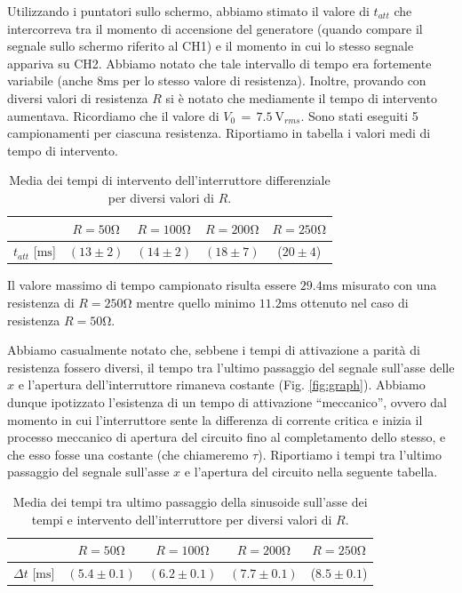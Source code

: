 Utilizzando i puntatori sullo schermo, abbiamo stimato il valore di $t_{att}$ che intercorreva tra il momento di accensione del generatore (quando compare il segnale sullo schermo riferito al CH1) e il momento in cui lo stesso segnale appariva su CH2. Abbiamo notato che tale intervallo di tempo era fortemente variabile (anche $8\si{\milli\second}$ per lo stesso valore di resistenza). Inoltre, provando con diversi valori di resistenza $R$ si è notato che mediamente il tempo di intervento aumentava. Ricordiamo che il valore di $V_0 \, = \, \SI{7.5}{\volt}_{rms}$. Sono stati eseguiti 5 campionamenti per ciascuna resistenza. Riportiamo in tabella i valori medi di tempo di intervento.

\begin{table}[h]
\centering
\caption{Media dei tempi di intervento dell'interruttore differenziale per diversi valori di $R$.}
{\renewcommand{\arraystretch}{1.6}%
\begin{tabular}{c|c|c|c|c}
 & $R=50 \si{\ohm}$ & $R=100 \si{\ohm}$ & $R=200 \si{\ohm}$ & $R=250 \si{\ohm}$ \\      \hline
$t_{att}$ [$\si{\milli\second}$] & $(13 \pm 2)$ & $(14 \pm 2)$ & $(18 \pm 7)$ & ($20 \pm 4$) \\\end{tabular}}
\end{table}


Il valore massimo di tempo campionato risulta essere $29.4\si{\milli\second}$ misurato con una resistenza di $R=250 \si{\ohm}$ mentre quello minimo $11.2\si{\milli\second}$ ottenuto nel caso di resistenza $R=50 \si{\ohm}$.

Abbiamo casualmente notato che, sebbene i tempi di attivazione a parità di resistenza fossero diversi, il tempo tra l'ultimo passaggio del segnale sull'asse delle $x$ e l'apertura dell'interruttore rimaneva costante (Fig. \ref{fig:graph}). Abbiamo dunque ipotizzato l'esistenza di un tempo di attivazione ``meccanico'', ovvero dal momento in cui l'interruttore sente la differenza di corrente critica e inizia il processo meccanico di apertura del circuito fino al completamento dello stesso, e che esso fosse una costante (che chiameremo $\tau$).  Riportiamo i tempi tra l'ultimo passaggio del segnale sull'asse $x$ e l'apertura del circuito nella seguente tabella. 

\begin{table}[h]
\centering
\parbox{14 cm}{\caption{Media dei tempi tra ultimo passaggio della sinusoide sull'asse dei tempi e intervento dell'interruttore per diversi valori di $R$.}}
{\renewcommand{\arraystretch}{1.6}%
\begin{tabular}{c|c|c|c|c}
 & $R=50 \si{\ohm}$ & $R=100 \si{\ohm}$ & $R=200 \si{\ohm}$ & $R=250 \si{\ohm}$ \\      \hline
$\Delta t$ [$\si{\milli\second}$] & $(5.4 \pm 0.1)$ & $(6.2 \pm 0.1)$ & $(7.7 \pm 0.1)$ & ($8.5 \pm 0.1$) \\
\end{tabular}}
\end{table}

